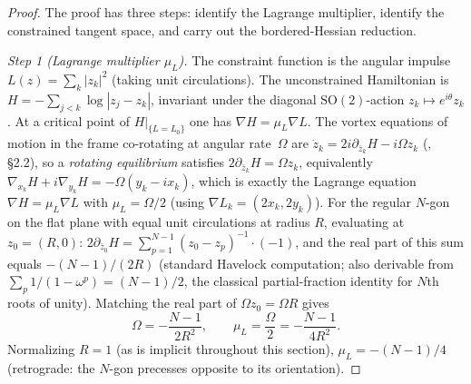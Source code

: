 \begin{proof}
The proof has three steps: identify the Lagrange multiplier,
identify the constrained tangent space, and carry out the
bordered-Hessian reduction.

\emph{Step 1 (Lagrange multiplier $\mu_L$).}
The constraint function is the angular impulse
$L(z) = \sum_{k} |z_k|^2$ (taking unit circulations).
The unconstrained Hamiltonian is $H = -\sum_{j<k}
\log|z_j - z_k|$, invariant under the diagonal
$\mathrm{SO}(2)$-action $z_k \mapsto e^{i\theta} z_k$.
At a critical point of $H|_{\{L = L_0\}}$ one has
$\nabla H = \mu_L \nabla L$.  The vortex equations of
motion in the frame co-rotating at angular rate~$\Omega$
are $\dot z_k = 2 i \partial_{\bar z_k} H - i\Omega z_k$
(\citealt{Newton2001}, \S2.2), so a \emph{rotating
equilibrium} satisfies
$2\partial_{\bar z_k} H = \Omega z_k$, equivalently
$\nabla_{x_k}\! H + i \nabla_{y_k}\! H = -\Omega(y_k - i x_k)$,
which is exactly the Lagrange equation
$\nabla H = \mu_L \nabla L$ with $\mu_L = \Omega/2$
(using $\nabla L_k = (2 x_k, 2 y_k)$).
For the regular $N$-gon on the flat plane with equal
unit circulations at radius $R$, evaluating at $z_0 = (R,0)$:
$2 \partial_{\bar z_0}\! H = \sum_{p=1}^{N-1} (z_0 - z_p)^{-1}
\cdot (-1)$, and the real part of this sum equals $-(N-1)/(2R)$
(standard Havelock computation; also derivable from
$\sum_p 1/(1 - \omega^p) = (N-1)/2$, the classical partial-fraction
identity for $N$th roots of unity).  Matching the real part of
$\Omega z_0 = \Omega R$ gives
\begin{equation}\label{eq:omega-value}
  \Omega = -\frac{N-1}{2R^2},
  \qquad \mu_L = \frac{\Omega}{2} = -\frac{N-1}{4R^2}.
\end{equation}
Normalizing $R = 1$ (as is implicit throughout this section),
$\mu_L = -(N-1)/4$ (retrograde: the $N$-gon precesses opposite
to its orientation).


\end{proof}
